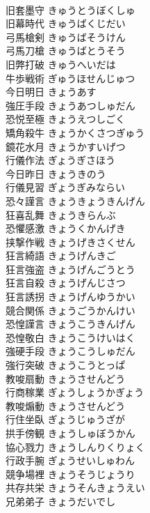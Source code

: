 \documentclass[8pt]{extreport}
\begin{document}
\begin{CJK}{UTF8}{min}
\\	旧套墨守	きゅうとうぼくしゅ	
\\	旧幕時代	きゅうばくじだい	
\\	弓馬槍剣	きゅうばそうけん	
\\	弓馬刀槍	きゅうばとうそう	
\\	旧弊打破	きゅうへいだは	
\\	牛歩戦術	ぎゅうほせんじゅつ	
\\	今日明日	きょうあす	
\\	強圧手段	きょうあつしゅだん	
\\	恐悦至極	きょうえつしごく	
\\	矯角殺牛	きょうかくさつぎゅう	
\\	鏡花水月	きょうかすいげつ	
\\	行儀作法	ぎょうぎさほう	
\\	今日昨日	きょうきのう	
\\	行儀見習	ぎょうぎみならい	
\\	恐々謹言	きょうきょうきんげん	
\\	狂喜乱舞	きょうきらんぶ	
\\	恐懼感激	きょうくかんげき	
\\	挟撃作戦	きょうげきさくせん	
\\	狂言綺語	きょうげんきご	
\\	狂言強盗	きょうげんごうとう	
\\	狂言自殺	きょうげんじさつ	
\\	狂言誘拐	きょうげんゆうかい	
\\	競合関係	きょうごうかんけい	
\\	恐惶謹言	きょうこうきんげん	
\\	恐惶敬白	きょうこうけいはく	
\\	強硬手段	きょうこうしゅだん	
\\	強行突破	きょうこうとっぱ	
\\	教唆扇動	きょうさせんどう	
\\	行商稼業	ぎょうしょうかぎょう	
\\	教唆煽動	きょうさせんどう	
\\	行住坐臥	ぎょうじゅうざが	
\\	拱手傍観	きょうしゅぼうかん	
\\	協心戮力	きょうしんりくりょく	
\\	行政手腕	ぎょうせいしゅわん	
\\	競争場裡	きょうそうじょうり	
\\	共存共栄	きょうそんきょうえい	
\\	兄弟弟子	きょうだいでし	

\end{CJK}
\end{document}
